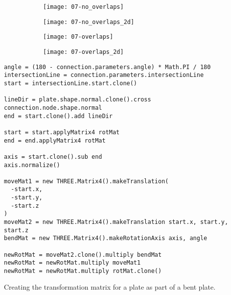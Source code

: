 \documentclass[../ClassicThesis.tex]{subfiles}
\begin{document}
\begin{figure}[h]
  \centering
  \begin{subfigure}[b]{0.49\textwidth}
    \centering
    \texttt{[image: 07-no\_overlaps]}
    \caption{}
    \label{fig:bend-matrix:1}
  \end{subfigure}
  \begin{subfigure}[b]{0.49\textwidth}
    \centering
    \texttt{[image: 07-no\_overlaps\_2d]}
    \caption{}
    \label{fig:bend-matrix:2}
  \end{subfigure}
  \begin{subfigure}[b]{0.49\textwidth}
    \centering
    \texttt{[image: 07-overlaps]}
    \caption{}
    \label{fig:bend-matrix:3}
  \end{subfigure}
  \begin{subfigure}[b]{0.49\textwidth}
    \centering
    \texttt{[image: 07-overlaps\_2d]}
    \caption{}
    \label{fig:bend-matrix:4}
  \end{subfigure}
  \caption{}
  \label{fig:bend-matrix}
\end{figure}

\begin{listing}[ht]
\begin{verbatim}
angle = (180 - connection.parameters.angle) * Math.PI / 180
intersectionLine = connection.parameters.intersectionLine
start = intersectionLine.start.clone()

lineDir = plate.shape.normal.clone().cross connection.node.shape.normal
end = start.clone().add lineDir

start = start.applyMatrix4 rotMat
end = end.applyMatrix4 rotMat

axis = start.clone().sub end
axis.normalize()

moveMat1 = new THREE.Matrix4().makeTranslation(
  -start.x,
  -start.y,
  -start.z
)
moveMat2 = new THREE.Matrix4().makeTranslation start.x, start.y, start.z
bendMat = new THREE.Matrix4().makeRotationAxis axis, angle

newRotMat = moveMat2.clone().multiply bendMat
newRotMat = newRotMat.multiply moveMat1
newRotMat = newRotMat.multiply rotMat.clone()
\end{verbatim}
\caption{Creating the transformation matrix for a plate as part of a bent plate.}
\label{lst:bend-matrix}
\end{listing}
\end{document}

